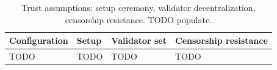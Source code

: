 \begin{table}[t]
  \centering
  \caption{Trust assumptions: setup ceremony, validator decentralization,
    censorship resistance. TODO populate.}
  \label{tab:trust}
  \begin{tabularx}{\columnwidth}{lXXX}
    \toprule
    Configuration & Setup & Validator set & Censorship resistance \\
    \midrule
    TODO & TODO & TODO & TODO \\
    \bottomrule
  \end{tabularx}
\end{table}
